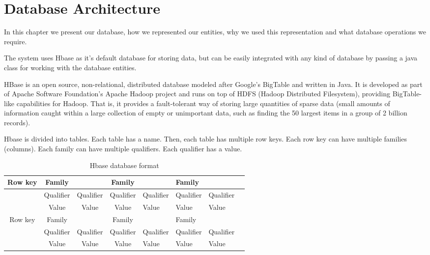 \chapter{Database Architecture}
\label{chapter:database-architecture}
In this chapter we present our database, how we represented our entities, why we used this representation and what database operations we require.

The system uses Hbase as it’s default database for storing data, but can be easily integrated with any kind of database by passing a java class for working with the database entities.

HBase is an open source, non-relational, distributed database modeled after Google's BigTable and written in Java. It is developed as part of Apache Software Foundation's Apache Hadoop project and runs on top of HDFS (Hadoop Distributed Filesystem), providing BigTable-like capabilities for Hadoop. That is, it provides a fault-tolerant way of storing large quantities of sparse data (small amounts of information caught within a large collection of empty or unimportant data, such as finding the 50 largest items in a group of 2 billion records).

Hbase is divided into tables. Each table has a name. Then, each table has multiple row keys. Each row key can have multiple families (columns). Each family can have multiple qualifiers. Each qualifier has a value.

\begin{table}[h]
  \caption{Hbase database format}
\centering
\begin{tabular}{@{}ccccllll@{}}

Row key                & Family                         &                                & Family                         &                                & Family    &           \\ \toprule 
& Qualifier                      & Qualifier                      & Qualifier                      & Qualifier                      & Qualifier & Qualifier \\ 
                       & Value                          & Value                          & Value                          & Value                          & Value     & Value     \\ 
Row key                & Family                         &                                & Family                         &                                & Family    &           \\ \toprule 
 & Qualifier & Qualifier & Qualifier & Qualifier & Qualifier & Qualifier \\ 
 & Value     & Value     & Value     & Value     & Value     & Value     \\ 
\end{tabular}
\end{table}

